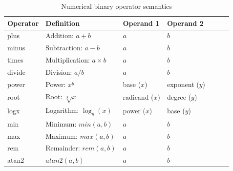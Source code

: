 %

\begin{table}[ht!]
\begin{center}
\small
\begin{tabular}{lllllll}\toprule
Operator & Definition & Operand 1 & Operand 2 \\\midrule
plus & Addition: $a +b$ & $a$ & $b$ \\
minus & Subtraction: $a - b$ & $a$ & $b$ \\
times & Multiplication: $a \times b$ & $a$ & $b$ \\
divide & Division: $a/b$  & $a$ & $b$ \\
power & Power: $x^y$ & base ($x$) & exponent ($y$) \\
root & Root: $\sqrt[y]{x}$ & radicand ($x$) & degree ($y$) \\
logx & Logarithm: $\log_y(x)$ & power ($x$) & base ($y$) \\
min & Minimum: $min(a,b)$ & $a$ & $b$ \\ 
max & Maximum: $max(a,b)$ & $a$ & $b$ \\ 
rem & Remainder: $rem(a,b)$ & $a$ & $b$ \\ 
atan2 & $atan2(a,b)$ & $a$ & $b$ \\ \bottomrule
\end{tabular}
\end{center}
\caption{Numerical binary operator semantics}
\label{tab:bin-op-semantics}
\end{table}%


